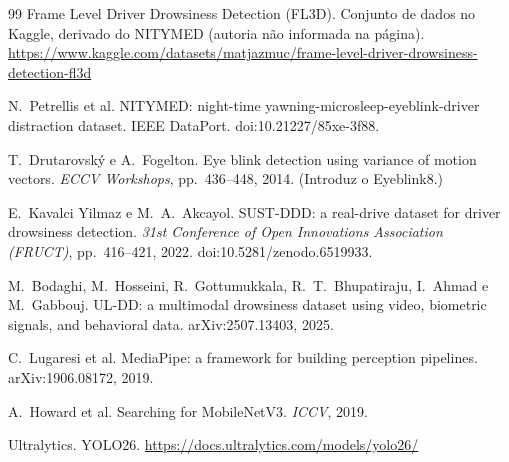 \documentclass[11pt,a4paper]{article}
\begin{document}
\begin{thebibliography}{99}
 Frame Level Driver Drowsiness Detection (FL3D). Conjunto de dados no Kaggle, derivado do NITYMED (autoria não informada na página). \url{https://www.kaggle.com/datasets/matjazmuc/frame-level-driver-drowsiness-detection-fl3d}

 N.~Petrellis et al. NITYMED: night-time yawning-microsleep-eyeblink-driver distraction dataset. IEEE DataPort. doi:10.21227/85xe-3f88.

 T.~Drutarovský e A.~Fogelton. Eye blink detection using variance of motion vectors. \emph{ECCV Workshops}, pp.~436--448, 2014. (Introduz o Eyeblink8.)

 E.~Kavalci Yilmaz e M.~A.~Akcayol. SUST-DDD: a real-drive dataset for driver drowsiness detection. \emph{31st Conference of Open Innovations Association (FRUCT)}, pp.~416--421, 2022. doi:10.5281/zenodo.6519933.

 M.~Bodaghi, M.~Hosseini, R.~Gottumukkala, R.~T.~Bhupatiraju, I.~Ahmad e M.~Gabbouj. UL-DD: a multimodal drowsiness dataset using video, biometric signals, and behavioral data. arXiv:2507.13403, 2025.

 C.~Lugaresi et al. MediaPipe: a framework for building perception pipelines. arXiv:1906.08172, 2019.

 A.~Howard et al. Searching for MobileNetV3. \emph{ICCV}, 2019.

 Ultralytics. YOLO26. \url{https://docs.ultralytics.com/models/yolo26/}

\end{thebibliography}
\end{document}
